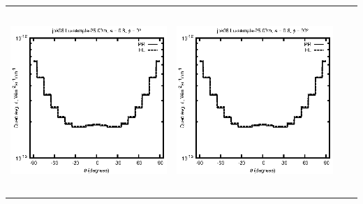 \begin{tabular}{c c c c}
\includegraphics[height=7cm]{../eps/jok08_Lu_sample_25.00m_fwd.eps} &
\includegraphics[height=7cm]{../eps/jok08_Lu_sample_25.00m_cross.eps} \\
\end{tabular}

\pagebreak

